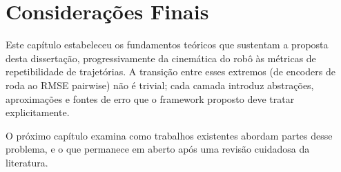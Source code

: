 \section{Considerações Finais}
\label{sec:fund_conclusao}

Este capítulo estabeleceu os fundamentos teóricos que sustentam a proposta desta
dissertação, progressivamente da cinemática do robô às métricas de repetibilidade
de trajetórias. A transição entre esses extremos (de encoders de roda ao RMSE
pairwise) não é trivial; cada camada introduz abstrações, aproximações e fontes
de erro que o framework proposto deve tratar explicitamente.

O próximo capítulo examina como trabalhos existentes abordam partes desse problema,
e o que permanece em aberto após uma revisão cuidadosa da literatura.
